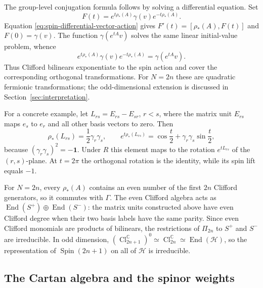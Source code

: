 \documentclass{article}
\theoremstyle{definition}
\theoremstyle{remark}
\newcommand{\C}{\mathbb C}
\newcommand{\Cl}{\operatorname{Cl}}
\newcommand{\End}{\operatorname{End}}
\newcommand{\Spin}{\operatorname{Spin}}
\begin{document}
The group-level conjugation formula follows by solving a differential
equation.  Set
\begin{equation*}
 F(t)=e^{t\rho_*(A)}\gamma(v)e^{-t\rho_*(A)}.
\end{equation*}
Equation \eqref{eq:spin-differential-vector-action} gives
$F'(t)=[\rho_*(A),F(t)]$ and $F(0)=\gamma(v)$. The function
$\gamma(e^{tA}v)$ solves the same linear initial-value problem, whence
\begin{equation}
 e^{t\rho_*(A)}\gamma(v)e^{-t\rho_*(A)}
 =\gamma(e^{tA}v).
\end{equation}
Thus Clifford bilinears exponentiate to the spin action and cover the
corresponding orthogonal transformations. For $N=2n$ these are quadratic
fermionic transformations; the odd-dimensional extension is discussed in
Section~\ref{sec:interpretation}.

For a concrete example, let
$L_{rs}=E_{rs}-E_{sr}$, $r<s$, where the matrix unit $E_{rs}$ maps $e_s$ to
$e_r$ and all other basis vectors to zero. Then
\begin{equation*}
 \rho_*(L_{rs})=\frac12\gamma_r\gamma_s,
 \qquad
 e^{t\rho_*(L_{rs})}
 =\cos\frac t2+\gamma_r\gamma_s\sin\frac t2,
\end{equation*}
because $(\gamma_r\gamma_s)^2=-\mathbf1$.  Under $R$ this element maps
to the rotation $e^{tL_{rs}}$ of the $(r,s)$-plane.  At $t=2\pi$ the
orthogonal rotation is the identity, while its spin lift equals $-1$.

For $N=2n$, every $\rho_*(A)$ contains an even number of the first
$2n$ Clifford generators, so it commutes with $\Gamma$.  The even Clifford algebra acts as
$\End(S^+)\oplus\End(S^-)$: the matrix units constructed above have
even Clifford degree when their two basis labels have the same
parity. Since even Clifford monomials are products of bilinears, the
restrictions of $\Pi_{2n}$ to $S^+$ and $S^-$ are irreducible.  In odd dimension,
$(\Cl_{2n+1}^\C)^0\simeq\Cl_{2n}^\C\simeq\End(\mathcal H)$, so the
representation of $\Spin(2n+1)$ on all of $\mathcal H$ is irreducible.

\subsection{The Cartan algebra and the spinor weights}
\label{sec:cartan-spinor-weights}
\end{document}
